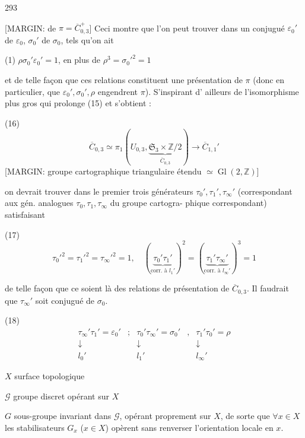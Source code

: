 \newpage


293

[MARGIN: de $\pi = \overline{C}_{0,3}^+$]
Ceci montre que l'on peut trouver dans 
un conjugué $\varepsilon_0'$ de $\varepsilon_0$, $\sigma_0'$ de $\sigma_0$, tels qu'on ait

(1) $\rho \sigma_0' \varepsilon_0' = 1$, en plus de $\rho^3 = {\sigma_0'}^2 = 1$

et de telle façon que ces relations constituent
une présentation de $\pi$ (donc en particulier,
que $\varepsilon_0', \sigma_0', \rho$ engendrent $\pi$). S'inspirant d'
ailleurs de l'isomorphisme plus gros qui
prolonge (15) et s'obtient :

(16) $$\overline{C}_{0,3} \simeq \pi_1 ( U_{0,3}, \underset{\overline{C}_{0,3}}{\underbrace{\mathfrak{S}_3 \times \mathbb{Z}/2}} ) \longrightarrow \overline{C}_{1,1}'$$
[MARGIN: groupe cartographique triangulaire étendu $\simeq \operatorname{Gl}(2, \mathbb{Z})$]

on devrait trouver dans le premier
trois générateurs $\tau_0', \tau_1', \tau_\infty'$ (correspondant aux
gén. analogues $\tau_0, \tau_1, \tau_\infty$ du groupe cartogra-
phique correspondant) satisfaisant

(17) $${\tau_0'}^2 = {\tau_1'}^2 = {\tau_\infty'}^2 = 1, \quad (\underbrace{\tau_0' \tau_1'}_{\text{corr. à } l_1'})^2 = (\underbrace{\tau_1' \tau_\infty'}_{\text{corr. à } l_\infty'})^3 = 1$$

de telle façon que ce soient là des
relations de présentation de $\overline{C}_{0,3}$. Il
faudrait que $\tau_\infty'$ soit conjugué de $\sigma_0$.

(18) $$
\begin{matrix}
\tau_\infty' \tau_1' = \varepsilon_0' & ; & \tau_0' \tau_\infty' = \sigma_0' & , & \tau_1' \tau_0' = \rho \\
\downarrow & & \downarrow & & \downarrow \\
l_0' & & l_1' & & l_\infty'
\end{matrix}
$$

\newpage


$X$ surface topologique

$\mathcal{G}$ groupe discret opérant sur $X$

$G$ sous-groupe invariant dans $\mathcal{G}$, opérant proprement sur $X$, de sorte que $\forall x \in X$ les stabilisateurs $G_x$ ($x \in X$) opèrent sans renverser l'orientation locale en $x$.

